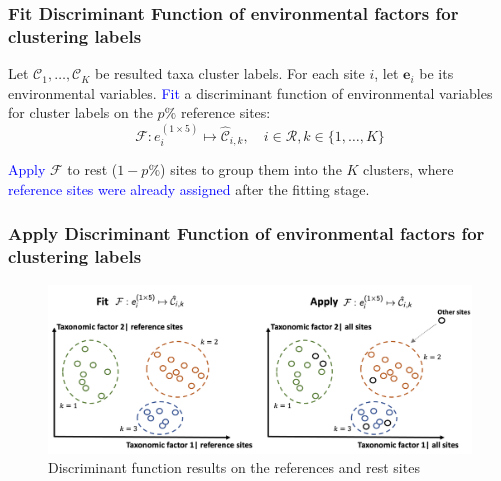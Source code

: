 \documentclass{beamer}
\begin{document}
\begin{frame}
\frametitle{Fit Discriminant Function of environmental factors for clustering labels}
\begin{center}
    \parbox{0.95\linewidth}{
        Let $\mathcal{C}_1, \ldots, \mathcal{C}_K$ be resulted taxa cluster labels.
        For each site $i$, let $\mathbf{e}_i$ be its environmental variables.
        \textcolor{blue}{Fit} a discriminant function of environmental variables for cluster labels on the \(p\%\) reference sites:
        \[
        \mathcal{F}: e_{i}^{(1 \times 5)} \mapsto \mathcal{\hat C}_{i, k}, \quad i \in \mathcal{R}, k \in \{1, \ldots, K\}
        \]
        }
\end{center}

\textcolor{blue}{Apply} $\mathcal{F}$ to rest (\(1 - p\%\)) sites to group them into the \(K\) clusters,
where \textcolor{blue}{reference sites were already assigned} after the fitting stage.

\end{frame}

\begin{frame}
\frametitle{Apply Discriminant Function of environmental factors for clustering labels}

\begin{figure}
\centering
\includegraphics[width=\textwidth]{figures/p12_fit_apply_discriminant_function.png}
\caption{Discriminant function results on the references and rest sites}
\end{figure}

\end{frame}
\end{document}
